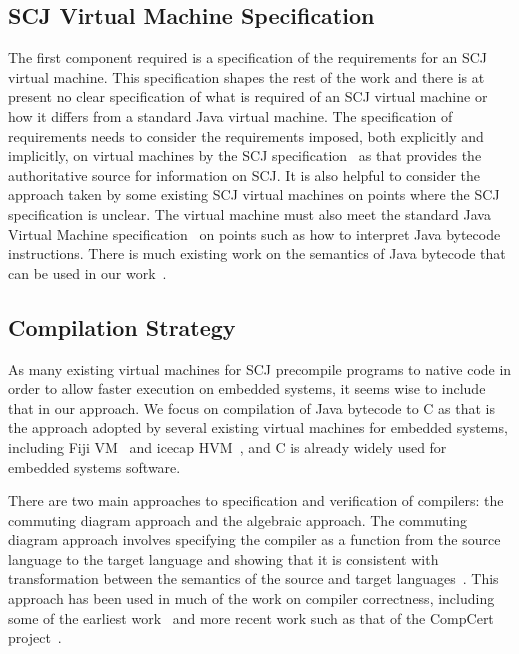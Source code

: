 \subsection{SCJ Virtual Machine Specification}

The first component required is a specification of the requirements
for an SCJ virtual machine.
This specification shapes the rest of the work and there is at present
no clear specification of what is required of an SCJ virtual machine
or how it differs from a standard Java virtual machine.
The specification of requirements needs to consider the requirements
imposed, both explicitly and implicitly, on virtual machines by the
SCJ specification~\cite{locke2013} as that provides the authoritative
source for information on SCJ.
It is also helpful to consider the approach taken by some existing SCJ
virtual machines on points where the SCJ specification is unclear.
The virtual machine must also meet the standard Java Virtual Machine
specification~\cite{lindholm2014} on points such as how to interpret
Java bytecode instructions.
There is much existing work on the semantics of Java bytecode that can
be used in our work~\cite{bertelsen2000, jones1998, stark2001}.

\subsection{Compilation Strategy}

As many existing virtual machines for SCJ precompile programs to
native code in order to allow faster execution on embedded systems, it
seems wise to include that in our approach.
We focus on compilation of Java bytecode to C as that is the approach
adopted by several existing virtual machines for embedded systems,
including Fiji VM~\cite{pizlo2009} and icecap
HVM~\cite{sondergaard2012}, and C is already widely used for embedded
systems software.

There are two main approaches to specification and verification of
compilers: the commuting diagram approach and the algebraic approach.
The commuting diagram approach involves specifying the compiler as a
function from the source language to the target language and showing
that it is consistent with transformation between the semantics of the
source and target languages~\cite{morris1973, thatcher1979}.
This approach has been used in much of the work on compiler
correctness, including some of the earliest work~\cite{mccarthy1967}
and more recent work such as that of the CompCert project~\cite{leroy2009a,
  leroy2009b}.

